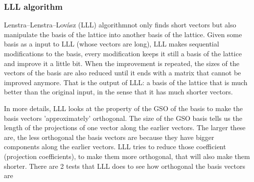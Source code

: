 \subsubsection{LLL algorithm}
\label{sec:LLLalgorithm}
Lenstra–Lenstra–Lovász (LLL) algorithmnot only finds short vectors but also
manipulate the basis of the lattice into another basis of the lattice. Given
some basis as a input to LLL (whose vectors are long), LLL makes sequential
modifications to the basis, every modification keeps it still a basis of the
lattice and improve it a little bit. When the improvement is repeated, the sizes
of the vectors of the basis are also reduced until it ends with a matrix that
cannot be improved anymore. That is the output of LLL: a basis of the lattice
that is much better than the original input, in the sense that it has much
shorter vectors.

In more details, LLL looks at the property of the GSO of the basis to make the
basis vectors 'approximately' orthogonal. The size of the GSO basis tells us the
length of the projections of one vector along the earlier vectors. The larger
these are, the less orthogonal the basis vectors are because they have bigger
components along the earlier vectors. LLL tries to reduce those coefficient
(projection coefficients), to make them more orthogonal, that will also make
them shorter. There are 2 tests that LLL does to see how orthogonal the basis
vectors are

